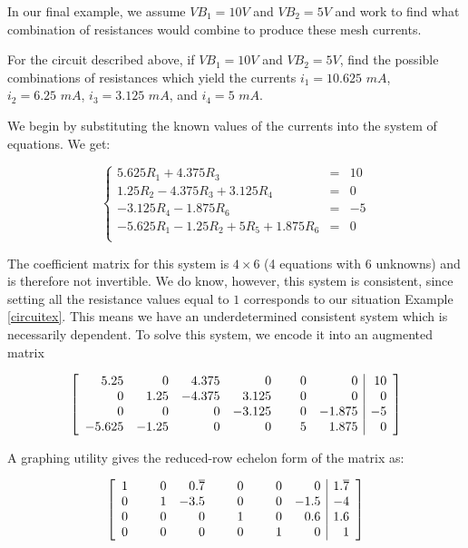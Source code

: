\documentclass{ximera}
\begin{document}
 In our final example, we assume  $V\!B_1 = 10 V$ and  $V\!B_2 = 5 V$  and work to find what combination of resistances would combine to produce these mesh currents.
 

\begin{example}  \label{circuitex02}  For the circuit described above, if $V\!B_1 = 10 V$ and $V\!B_2 = 5 V$, find the possible combinations of resistances which yield the currents  $i_1 = 10.625 \, \, mA$, $i_2 = 6.25 \, \, mA$, $i_3 = 3.125 \, \, mA$, and $i_4 = 5 \, \, mA$.


\begin{explanation}

We begin by substituting the known values of the currents into the system of equations.  We get:

\[ \left\{ \begin{array}{rcr} 5.625R_1 + 4.375R_3& = & 10 \\
1.25R_2 - 4.375R_3 + 3.125R_4& = & 0 \\
-3.125R_4 - 1.875R_6 & = & -5 \\
-5.625R_1 - 1.25R_2 + 5R_5 + 1.875R_6 & = & 0 \\  \end{array} \right.\]

The coefficient matrix for this system is $4 \times 6$ (4 equations with 6 unknowns) and is therefore not invertible.  We do know, however, this system is consistent, since setting all the resistance values equal to $1$ corresponds to our situation Example \ref{circuitex}.  This means we have an underdetermined consistent system which is necessarily dependent.  To solve this system, we encode it into an augmented matrix

\[ \left[ \begin{array}{rrrrrr|r} 
5.25 & 0 & 4.375 & 0 & \hphantom{1.2}0 & 0 & 10 \\ 
0 & 1.25 & -4.375 & 3.125 & 0 & 0 & 0 \\ 
0 & 0 & 0 & -3.125 & 0 & -1.875 & -5 \\
 -5.625 & -1.25 & 0 & 0 & 5 & 1.875 & 0 \\ 
 \end{array} \right] \]

A graphing utility gives the reduced-row echelon form of the matrix as:

\[\left[ \begin{array}{rrrrrr|r} 
1 & \hphantom{-1.}0 & 0.\overline{7} & \hphantom{-1.}0 & \hphantom{-1.}0 & 0 & 1.\overline{7} \\ 
0 & 1 & -3.5           & 0 & 0 & -1.5 & -4 \\ 
0 & 0 & 0              & 1 & 0 & 0.6 & 1.6 \\ 
0 & 0 & 0              & 0 & 1 & 0 & 1 \\ 
\end{array} \right] \]


\end{explanation}
\end{example}
\end{document}
